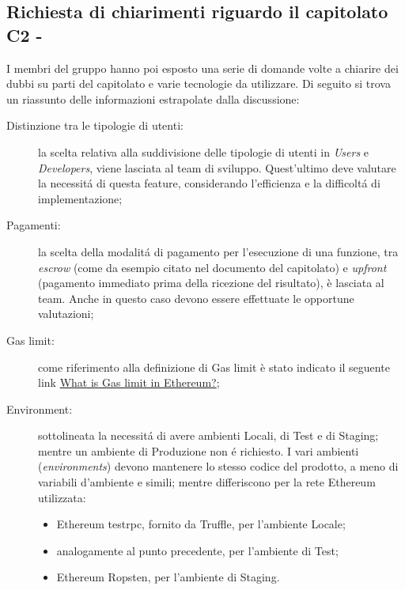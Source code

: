 \subsection{Richiesta di chiarimenti riguardo il capitolato C2 - \NomeProgetto}
I membri del gruppo hanno poi esposto una serie di domande volte a chiarire dei dubbi su parti del capitolato e varie tecnologie da utilizzare.
Di seguito si trova un riassunto delle informazioni estrapolate dalla discussione:
\begin{description}
	\item[Distinzione tra le tipologie di utenti:] la scelta relativa alla suddivisione delle tipologie di utenti in \textit{Users} e \textit{Developers}, viene lasciata al team di sviluppo. Quest'ultimo deve valutare la necessitá di questa feature, considerando l'efficienza e la difficoltá di implementazione;
	\item[Pagamenti:] la scelta della modalitá di pagamento per l'esecuzione di una funzione, tra \textit{escrow} (come da esempio citato nel documento del capitolato) e \textit{upfront} (pagamento immediato prima della ricezione del risultato), è lasciata al team. Anche in questo caso devono essere effettuate le opportune valutazioni;
	\item[Gas limit:] come riferimento alla definizione di Gas limit è stato indicato il seguente link \href{https://bitcoin.stackexchange.com/questions/39132/what-is-gas-limit-in-ethereum}{What is Gas limit in Ethereum?};
	\item[Environment:] sottolineata la necessitá di avere ambienti Locali, di Test e di Staging; mentre un ambiente di Produzione non é richiesto. I vari ambienti (\textit{environments}) devono mantenere lo stesso codice del prodotto, a meno di variabili d'ambiente e simili; mentre differiscono per la rete Ethereum utilizzata:
	\begin{itemize}
		\item Ethereum testrpc, fornito da Truffle, per l'ambiente Locale;
		\item analogamente al punto precedente, per l'ambiente di Test;
		\item Ethereum Ropsten, per l'ambiente di Staging.
	\end{itemize}
\end{description}

